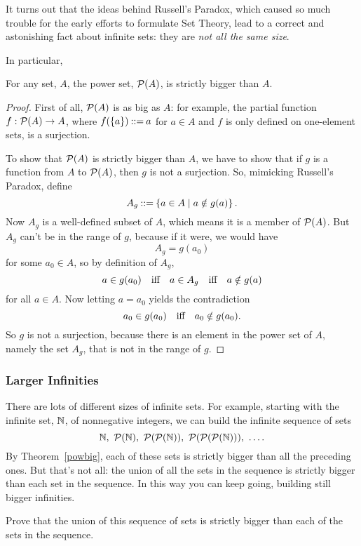 It turns out that the ideas behind Russell's Paradox, which caused so much
trouble for the early efforts to formulate Set Theory, lead to a correct
and astonishing fact about infinite sets: they are \emph{not all the same
  size}.

In particular,
\begin{theorem}\label{powbig}
For any set, $A$, the power set, $\mathcal{P}(A)$, is strictly bigger than $A$.
\end{theorem}
\begin{proof}
  First of all, $\mathcal{P}(A)$ is as big as $A$: for example, the partial
  function $f:\mathcal{P}(A) \to A$, where $f(\left\{a\right\}) \mathbin{::=} a$ for $a \in A$
  and $f$ is only defined on one-element sets, is a surjection.

  To show that $\mathcal{P}(A)$ is strictly bigger than $A$, we have to show
  that if $g$ is a function from $A$ to $\mathcal{P}(A)$, then $g$ is not a
  surjection.  So, mimicking Russell's Paradox, define
  \[
  A_g \mathbin{::=} \left\{a \in A \mid a \notin g(a)\right\}.
  \]
  Now $A_g$ is a well-defined subset of $A$, which means it is a member of
  $\mathcal{P}(A)$.  But $A_g$ can't be in the range of $g$, because if it
  were, we would have
\[
A_g = g(a_0)
\]
for some $a_0 \in A$, so by definition of $A_g$,
\[
a \in g(a_0) \quad \text{iff} \quad a \in A_g \quad \text{iff} \quad a \notin g(a)
\]
for all $a \in A$.  Now letting $a = a_0$ yields the contradiction
\[
a_0 \in g(a_0) \quad \text{iff} \quad a_0 \notin g(a_0).
\]
So $g$ is not a surjection, because there is an element in the power set
of $A$, namely the set $A_g$, that is not in the range of $g$.
\end{proof}

\subsubsection{Larger Infinities}

There are lots of different sizes of infinite sets.  For example, starting
with the infinite set, $\mathbb{N}$, of nonnegative integers, we can build
the infinite sequence of sets
\[
\naturals,\ \power(\naturals),\ \power(\power(\naturals)),\
\power(\power(\power(\naturals))),\ \dots.
\]
By Theorem~\ref{powbig}, each of these sets is strictly bigger than all
the preceding ones.  But that's not all: the union of all the sets in the
sequence is strictly bigger than each set in the sequence.  In this way
you can keep going, building still bigger infinities.

\begin{notesproblem}{}
  Prove that the union of this sequence of sets is strictly bigger than
  each of the sets in the sequence.
\end{notesproblem}

